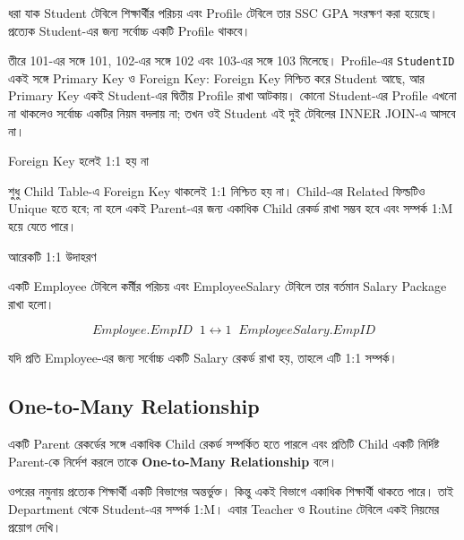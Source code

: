 ধরা যাক Student টেবিলে শিক্ষার্থীর পরিচয় এবং Profile টেবিলে
তার SSC GPA সংরক্ষণ করা হয়েছে। প্রত্যেক Student-এর জন্য সর্বোচ্চ
একটি Profile থাকবে।



তীরে 101-এর সঙ্গে 101, 102-এর সঙ্গে 102 এবং 103-এর সঙ্গে 103 মিলেছে।
Profile-এর \texttt{StudentID} একই সঙ্গে Primary Key ও Foreign Key:
Foreign Key নিশ্চিত করে Student আছে, আর Primary Key একই Student-এর
দ্বিতীয় Profile রাখা আটকায়। কোনো Student-এর Profile এখনো না থাকলেও
সর্বোচ্চ একটির নিয়ম বদলায় না; তখন ওই Student এই দুই টেবিলের INNER JOIN-এ আসবে না।

\begin{mistakebox}{Foreign Key হলেই 1:1 হয় না}

শুধু Child Table-এ Foreign Key থাকলেই 1:1 নিশ্চিত হয় না। Child-এর Related ফিল্ডটিও Unique হতে হবে; না হলে একই Parent-এর
জন্য একাধিক Child রেকর্ড রাখা সম্ভব হবে এবং সম্পর্ক 1:M
হয়ে যেতে পারে।

\end{mistakebox}


\begin{examplebox}{আরেকটি 1:1 উদাহরণ}

একটি Employee টেবিলে কর্মীর পরিচয় এবং EmployeeSalary টেবিলে
তার বর্তমান Salary Package রাখা হলো।

\[
Employee.EmpID
\;\;1
\longleftrightarrow
1\;\;
EmployeeSalary.EmpID
\]

যদি প্রতি Employee-এর জন্য সর্বোচ্চ একটি Salary রেকর্ড রাখা হয়,
তাহলে এটি 1:1 সম্পর্ক।

\end{examplebox}



\subsection{One-to-Many Relationship}

\begin{definitionbox}{}

একটি Parent রেকর্ডের সঙ্গে একাধিক Child রেকর্ড সম্পর্কিত হতে
পারলে এবং প্রতিটি Child একটি নির্দিষ্ট Parent-কে নির্দেশ করলে
তাকে \textbf{One-to-Many Relationship} বলে।

\end{definitionbox}


ওপরের নমুনায় প্রত্যেক শিক্ষার্থী একটি বিভাগের অন্তর্ভুক্ত। কিন্তু একই বিভাগে একাধিক শিক্ষার্থী থাকতে পারে। তাই Department থেকে Student-এর সম্পর্ক 1:M। এবার Teacher ও Routine টেবিলে একই নিয়মের প্রয়োগ দেখি।

